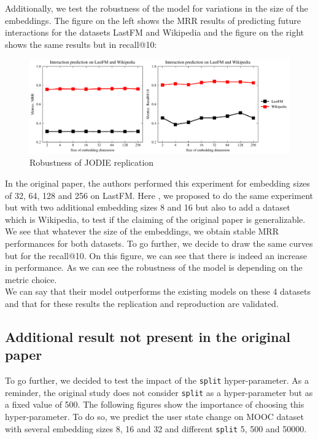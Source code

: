 Additionally, we test the robustness of the model for variations in the size of the embeddings. The figure on the left shows the MRR results of predicting future interactions for the datasets LastFM and Wikipedia and the figure on the right shows the same results but in recall@10:
\begin{figure}[H]
    \centering
    \includegraphics[width = \textwidth]{image/lastFM-wiki.pdf}
    \caption{Robustness of JODIE replication}
\end{figure}
In the original paper, the authors performed this experiment for embedding sizes of 32, 64, 128 and 256 on LastFM. Here , we proposed to do the same experiment but with two additional embedding sizes 8 and 16 but also to add a dataset which is Wikipedia, to test if the claiming of the original paper is generalizable. We see that whatever the size of the embeddings, we obtain stable MRR performances for both datasets. To go further, we decide to draw the same curves but for the recall@10. On this figure, we can see that there is indeed an increase in performance. As we can see the robustness of the model is depending on the metric choice.\\


We can say that their model outperforms the existing models on these 4 datasets and that for these results the replication and reproduction are validated.

\subsection*{Additional result not present in the original paper}

To go further, we decided to test the impact of the \texttt{split} hyper-parameter. As a reminder, the original study does not consider \texttt{split} as a hyper-parameter but as a fixed value of 500. The following figures show the importance of choosing this hyper-parameter. To do so, we predict the user state change on MOOC dataset with several embedding sizes 8, 16 and 32 and different \texttt{split} 5, 500 and 50000.

